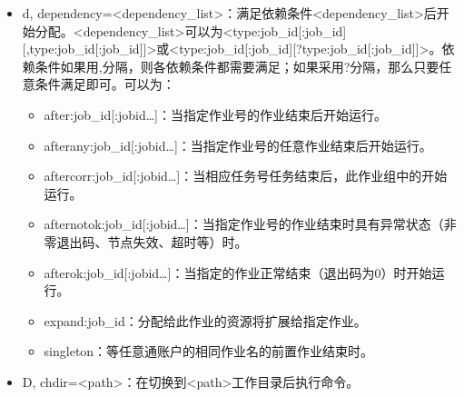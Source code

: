 \documentclass[a4paper,12pt,english]{sphinxmanual}
\begin{document}
\begin{itemize}
\begin{itemize}
\item {} 
\sphinxAtStartPar
MMDD{[}YY{]}或MM/DD{[}/YY{]}或MM.DD{[}.YY{]}

\item {} 
\sphinxAtStartPar
MM/DD{[}/YY{]}\sphinxhyphen{}HH:MM{[}:SS{]}

\item {} 
\sphinxAtStartPar
YYYY\sphinxhyphen{}MM\sphinxhyphen{}DD{[}THH:MM{[}:SS{]}{]}{]}

\end{itemize}

\item {} 
\sphinxAtStartPar
\sphinxhyphen{}d, \sphinxhyphen{}\sphinxhyphen{}dependency=<dependency\_list>：满足依赖条件<dependency\_list>后开始分配。<dependency\_list>可以为<type:job\_id{[}:job\_id{]}{[},type:job\_id{[}:job\_id{]}{]}>或<type:job\_id{[}:job\_id{]}{[}?type:job\_id{[}:job\_id{]}{]}>。依赖条件如果用,分隔，则各依赖条件都需要满足；如果采用?分隔，那么只要任意条件满足即可。可以为：
\begin{itemize}
\item {} 
\sphinxAtStartPar
after:job\_id{[}:jobid…{]}：当指定作业号的作业结束后开始运行。

\item {} 
\sphinxAtStartPar
afterany:job\_id{[}:jobid…{]}：当指定作业号的任意作业结束后开始运行。

\item {} 
\sphinxAtStartPar
aftercorr:job\_id{[}:jobid…{]}：当相应任务号任务结束后，此作业组中的开始运行。

\item {} 
\sphinxAtStartPar
afternotok:job\_id{[}:jobid…{]}：当指定作业号的作业结束时具有异常状态（非零退出码、节点失效、超时等）时。

\item {} 
\sphinxAtStartPar
afterok:job\_id{[}:jobid…{]}：当指定的作业正常结束（退出码为0）时开始运行。

\item {} 
\sphinxAtStartPar
expand:job\_id：分配给此作业的资源将扩展给指定作业。

\item {} 
\sphinxAtStartPar
singleton：等任意通账户的相同作业名的前置作业结束时。

\end{itemize}

\item {} 
\sphinxAtStartPar
\sphinxhyphen{}D, \sphinxhyphen{}\sphinxhyphen{}chdir=<path>：在切换到<path>工作目录后执行命令。


\end{itemize}
\end{document}
